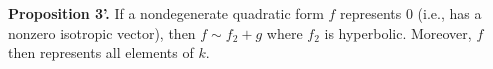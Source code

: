 \textbf{Proposition 3'.} If a nondegenerate quadratic form $f$ represents $0$ (i.e., has a nonzero isotropic vector), then $f \sim f_2 + g$ where $f_2$ is hyperbolic. Moreover, $f$ then represents all elements of $k$.
